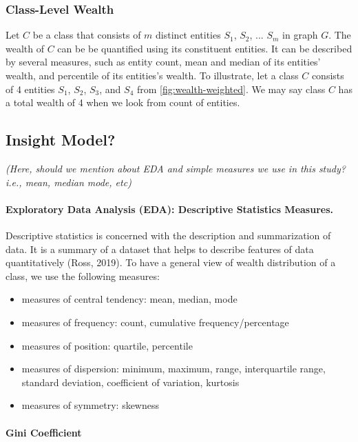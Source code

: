 \documentclass[
]{ceurart}
\begin{document}
\subsubsection{Class-Level Wealth}
Let \(C\) be a class that consists of \(m\) distinct entities \(S_1\), \(S_2\), ... \(S_m\) in graph \(G\). The wealth of \(C\) can be be quantified using its constituent entities. It can be described by several measures, such as entity count, mean and median of its entities' wealth, and percentile of its entities's wealth. To illustrate, let a class \(C\) consists of 4 entities  \(S_1\), \(S_2\), \(S_3\), and \(S_4\) from \autoref{fig:wealth-weighted}. We may say class \(C\) has a total wealth of 4 when we look from count of entities.


\subsection{Insight Model?}

\textit{(Here, should we mention about EDA and simple measures we use in this study? i.e., mean, median mode, etc)}

\paragraph{Exploratory Data Analysis (EDA): Descriptive Statistics Measures.} Descriptive statistics is concerned with the description and summarization of data. It is a summary of a dataset that helps to describe features of data quantitatively (Ross, 2019). To have a general view of wealth distribution of a class, we use the following measures:
\begin{itemize}
  \item measures of central tendency: mean, median, mode
  \item measures of frequency: count, cumulative frequency/percentage
  \item measures of position: quartile, percentile
  \item measures of dispersion: minimum, maximum, range, interquartile range, standard deviation, coefficient of variation, kurtosis
  \item measures of symmetry: skewness
\end{itemize}


\paragraph{Gini Coefficient}
\end{document}
